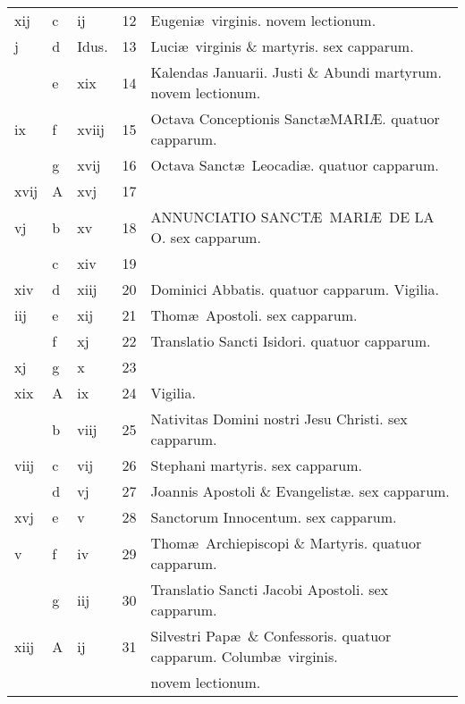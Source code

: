 \documentclass[letter,11pt]{book}
\begin{document}
\begin{center}
\begin{tabular}{l | l | l | r | l}
\color{Red} xij & c & \color{Red} ij & 12 & Eugeni\ae \ virginis. \color{Red} novem lectionum. \\
\color{Red} j & d & Idus. & 13 & Luci\ae \ virginis \& martyris. \color{Red} sex capparum. \\
\color{Red}  & e & \color{Red} xix & 14 & \color{Red} Kalendas Januarii. \color{black} Justi \& Abundi martyrum. \color{Red} novem lectionum. \\
\color{Red} ix & f & \color{Red} xviij & 15 & Octava Conceptionis Sanct\ae MARI\AE . \color{Red} quatuor capparum. \\
\color{Red}  & g & \color{Red} xvij & 16 & Octava Sanct\ae \ Leocadi\ae . \color{Red} quatuor capparum. \\
\color{Red} xvij & \color{Red} A & \color{Red} xvj & 17 & \\
\color{Red} vj & b & \color{Red} xv & 18 & \color{Red} ANNUNCIATIO SANCT\AE \ MARI\AE \ DE LA O. \color{black} sex capparum. \\
\color{Red}  & c & \color{Red} xiv & 19 & \\
\color{Red} xiv & d & \color{Red} xiij & 20 & Dominici Abbatis. \color{Red} quatuor capparum. \color{black} Vigilia. \\
\color{Red} iij & e & \color{Red} xij & 21 & \color{Red} Thom\ae \ Apostoli. \color{black} sex capparum. \\
\color{Red}  & f & \color{Red} xj & 22 & Translatio Sancti Isidori. \color{Red} quatuor capparum. \\
\color{Red} xj & g & \color{Red} x & 23 & \\
\color{Red} xix & \color{Red} A & \color{Red} ix & 24 & \qquad Vigilia. \\
\color{Red}  & b & \color{Red} viij & 25 & \color{Red} Nativitas Domini nostri Jesu Christi. \color{black} sex capparum. \\
\color{Red} viij & c & \color{Red} vij & 26 & \color{Red} Stephani martyris. \color{black} sex capparum. \\
\color{Red}  & d & \color{Red} vj & 27 & \color{Red} Joannis Apostoli \& Evangelist\ae . \color{black} sex capparum. \\
\color{Red} xvj & e & \color{Red} v & 28 & \color{Red} Sanctorum Innocentum. \color{black} sex capparum. \\
\color{Red} v & f & \color{Red} iv & 29 & Thom\ae \ Archiepiscopi \& Martyris. \color{Red} quatuor capparum. \\
\color{Red}  & g & \color{Red} iij & 30 & Translatio Sancti Jacobi Apostoli. \color{Red} sex capparum. \\
\color{Red} xiij & \color{Red} A & \color{Red} ij & 31 & Silvestri Pap\ae \ \& Confessoris. \color{Red} quatuor capparum. \color{black} Columb\ae \ virginis. \\
 &  &  &  & \quad \color{Red} novem lectionum. \\
\end{tabular}
\end{center}
\end{document}
